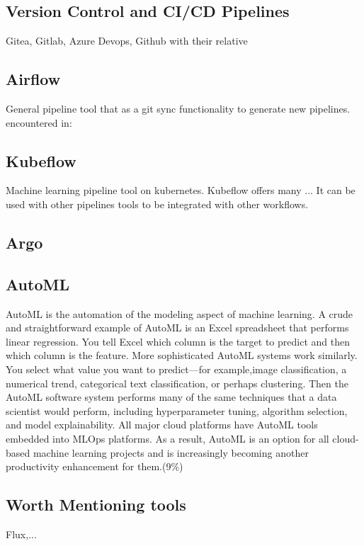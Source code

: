 \subsection{Version Control and CI/CD Pipelines}
Gitea, Gitlab, Azure Devops, Github with their relative
\subsection{Airflow}
General pipeline tool that as a git sync functionality to generate new pipelines.
encountered in:
\subsection{Kubeflow}
Machine learning pipeline tool on kubernetes.
Kubeflow offers many ...
It can be used with other pipelines tools to be integrated with other workflows.
\subsection{Argo}
\subsection{AutoML}

AutoML is the automation of the modeling aspect of machine learning.
A crude and straightforward example of AutoML is an Excel spreadsheet that performs linear regression.
You tell Excel which column is the target to predict and then which column is the feature.
More sophisticated AutoML systems work similarly.
You select what value you want to predict—for example,image classification, a numerical trend,
categorical text classification, or perhaps clustering.
Then the AutoML software system performs many of the same techniques that a data scientist would perform,
including hyperparameter tuning, algorithm selection, and model explainability.
All major cloud platforms have AutoML tools embedded into MLOps platforms.
As a result, AutoML is an option for all cloud-based machine learning projects and is increasingly becoming another productivity enhancement for them.\cite{gift2021practical}(9\%)

\subsection{Worth Mentioning tools}
Flux,...